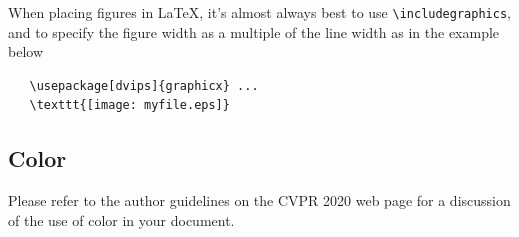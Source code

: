 \documentclass[10pt,twocolumn,letterpaper]{article}
\begin{document}
When placing figures in \LaTeX, it's almost always best to use
\verb+\includegraphics+, and to specify the  figure width as a multiple of
the line width as in the example below
{\small\begin{verbatim}
   \usepackage[dvips]{graphicx} ...
   \texttt{[image: myfile.eps]}
\end{verbatim}
}


\subsection{Color}

Please refer to the author guidelines on the CVPR 2020 web page for a discussion
of the use of color in your document.




{\small


}
\end{document}
